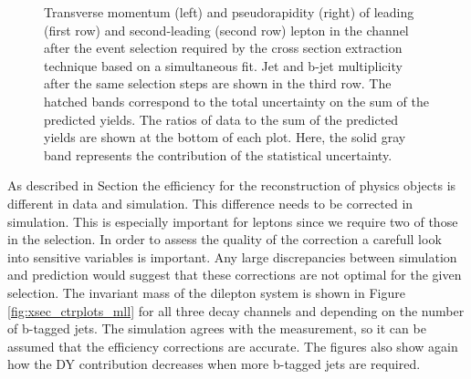\begin{figure}[htbp!]
\begin{center}
      \caption{Transverse momentum (left) and pseudorapidity (right)
        of leading (first row) and second-leading (second row) lepton in the \ee channel after the
        event selection required by the \ttbar cross section
        extraction technique based on a simultaneous fit. Jet and b-jet multiplicity after the same selection steps are
        shown in the third row. The hatched
        bands correspond to the total uncertainty on the sum of the
        predicted yields. 
        The ratios of data to the sum of the predicted yields are
        shown at the bottom of each plot. Here, the solid gray band
        represents the contribution of the statistical uncertainty.}  
       \label{fig:xsec_ee_ctrplots}
  \end{center}
\end{figure}

As described in Section  the efficiency for the reconstruction of physics objects is different in data and simulation. This difference needs to be corrected in simulation.
This is especially important for leptons since we require two of those in the selection.
In order to assess the quality of the correction a carefull look into sensitive variables is important. Any large discrepancies between simulation and prediction would suggest that these corrections
are not optimal for the given selection.
The invariant mass of the dilepton system is shown in Figure \ref{fig:xsec_ctrplots_mll} for all three decay channels and depending on the number of b-tagged jets.
The simulation agrees with the measurement, so it can be assumed that the efficiency corrections are accurate.
The figures also show again how the DY contribution decreases when more b-tagged jets are required.


